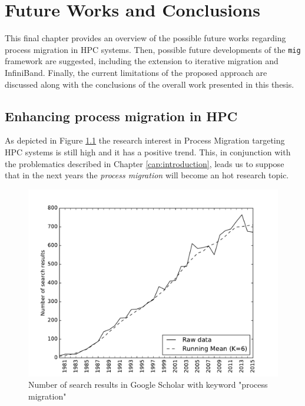 \chapter{Future Works and Conclusions}
\label{cap:discussion}

This final chapter provides an overview of the possible future works
regarding process migration in HPC systems. Then, possible future developments of the
\texttt{mig} framework are suggested, including the extension to
iterative migration and InfiniBand. Finally, the current
limitations of the proposed approach are discussed along with
the conclusions of the overall work presented in this thesis.

\section{Enhancing process migration in HPC}
As depicted in Figure \ref{fig:cap7-scholar-mig}
the research interest in Process Migration targeting HPC systems
is still high and it has
a positive trend. This, in conjunction with the problematics described in
Chapter \ref{cap:introduction}, leads us to suppose that in the next years
the \emph{process migration} will become an hot research topic.

\begin{figure}[t]
		\centerline 
{\includegraphics[scale=0.7]{img/cap7-scholar_mig}}
		\caption[Process migration trend in research]{Number of search results in Google Scholar with keyword
		"process migration"}
		\label{fig:cap7-scholar-mig}
\end{figure}


